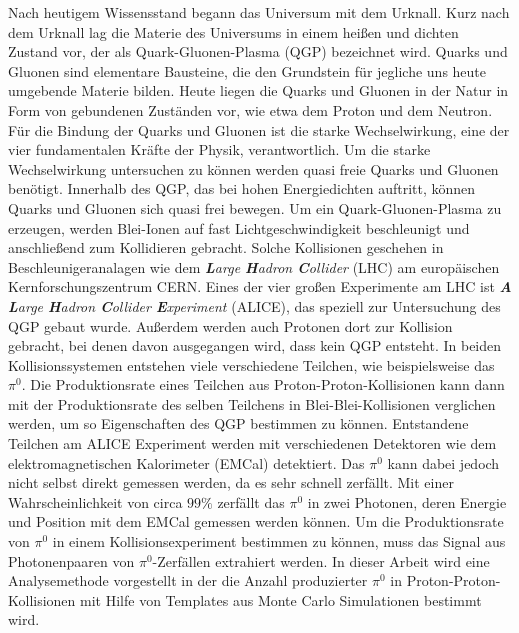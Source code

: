 Nach heutigem Wissensstand begann das Universum mit dem Urknall.
Kurz nach dem Urknall lag die Materie des Universums in einem heißen und dichten Zustand vor, der als Quark-Gluonen-Plasma (QGP) bezeichnet wird.
Quarks und Gluonen sind elementare Bausteine, die den Grundstein für jegliche uns heute umgebende Materie bilden.
Heute liegen die Quarks und Gluonen in der Natur in Form von gebundenen Zuständen vor, wie etwa dem Proton und dem Neutron.
\newline
Für die Bindung der Quarks und Gluonen ist die starke Wechselwirkung, eine der vier fundamentalen Kräfte der Physik, verantwortlich.
Um die starke Wechselwirkung untersuchen zu können werden quasi freie Quarks und Gluonen benötigt.
Innerhalb des QGP, das bei hohen Energiedichten auftritt, können Quarks und Gluonen sich quasi frei bewegen.
\newline
Um ein Quark-Gluonen-Plasma zu erzeugen, werden Blei-Ionen auf fast Lichtgeschwindigkeit beschleunigt und anschließend zum Kollidieren gebracht.
Solche Kollisionen geschehen in Beschleunigeranalagen wie dem \textit{\textbf{L}arge \textbf{H}adron \textbf{C}ollider} (LHC) am europäischen Kernforschungszentrum CERN.
Eines der vier großen Experimente am LHC ist \textit{\textbf{A} \textbf{L}arge \textbf{H}adron \textbf{C}ollider \textbf{E}xperiment} (ALICE), das speziell zur Untersuchung des QGP gebaut wurde.
\newline
Außerdem werden auch Protonen dort zur Kollision gebracht, bei denen davon ausgegangen wird, dass kein QGP entsteht.
In beiden Kollisionssystemen entstehen viele verschiedene Teilchen, wie beispielsweise das $\pi^{0}$.
Die Produktionsrate eines Teilchen aus Proton-Proton-Kollisionen kann dann mit der Produktionsrate des selben Teilchens in Blei-Blei-Kollisionen verglichen werden, um so Eigenschaften des QGP bestimmen zu können.
\newline
Entstandene Teilchen am ALICE Experiment werden mit verschiedenen Detektoren wie dem elektromagnetischen Kalorimeter (EMCal) detektiert.
Das $\pi^{0}$ kann dabei jedoch nicht selbst direkt gemessen werden, da es sehr schnell zerfällt.
Mit einer Wahrscheinlichkeit von circa $99\%$ zerfällt das $\pi^{0}$ in zwei Photonen, deren Energie und Position mit dem EMCal gemessen werden können.
Um die Produktionsrate von $\pi^{0}$ in einem Kollisionsexperiment bestimmen zu können, muss das Signal aus Photonenpaaren von $\pi^{0}$-Zerfällen extrahiert werden.
\newline
In dieser Arbeit wird eine Analysemethode vorgestellt in der die Anzahl produzierter $\pi^{0}$ in Proton-Proton-Kollisionen mit Hilfe von Templates aus Monte Carlo Simulationen bestimmt wird.
